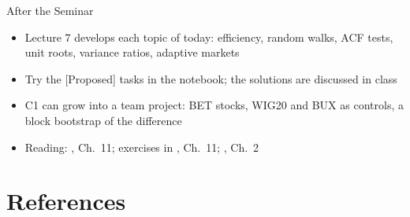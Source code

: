 \begin{frame}{After the Seminar}
\itemsize{\small}
\begin{itemize}
    \item Lecture 7 develops each topic of today: efficiency, random walks, ACF tests, unit roots, variance ratios, adaptive markets
    \item Try the [Proposed] tasks in the notebook; the solutions are discussed in class
    \item C1 can grow into a team project: BET stocks, WIG20 and BUX as controls, a block bootstrap of the difference
    \item Reading: , Ch.~11; exercises in , Ch.~11; , Ch.~2
\end{itemize}
\end{frame}


\section{References}

